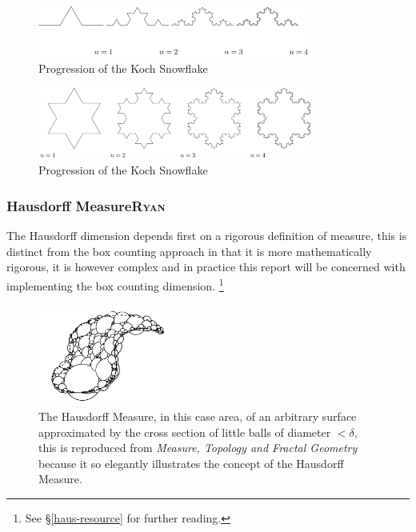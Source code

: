 \documentclass[a4paper,11pt,twoside]{article}
\begin{document}
\begin{figure}[htbp]
\centering
\includegraphics[width=9cm]{media/tikz/Koch_line.png}
\caption{\label{koch-line}Progression of the Koch Snowflake}
\end{figure}

\begin{figure}[htbp]
\centering
\includegraphics[width=9cm]{media/tikz/Snowflake.png}
\caption{\label{koch-snowflake}Progression of the Koch Snowflake}
\end{figure}

\subsubsection{Hausdorff Measure\hfill{}\textsc{Ryan}}
\label{hausdorff-measure}
The Hausdorff dimension depends first on a rigorous definition of measure, this is distinct from the box counting approach in that it is more mathematically rigorous, it is however complex and in practice this report will be concerned with implementing the box counting dimension. \footnote{See \S \ref{haus-resource} for further reading.}

\begin{figure}
\centering
\includegraphics[width=0.38\textwidth]{media/edgar_181_of_292.png}
\caption{\label{fig:ball-covering}The Hausdorff Measure, in this case area, of an arbitrary surface approximated by the cross section of little balls of diameter \(< \delta\), this is reproduced from \emph{Measure, Topology and Fractal Geometry} \cite[p. 166]{edgarMeasureTopologyFractal2008a} because it so elegantly illustrates the concept of the Hausdorff Measure.}
\end{figure}
\end{document}
